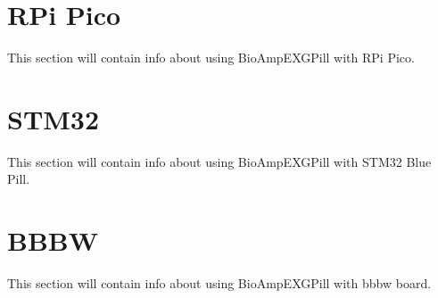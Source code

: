 \documentclass[a4paper,10pt,english,oneside]{sphinxmanual}
\begin{document}
\begin{DUlineblock}{0em}
\item[] 
\end{DUlineblock}


\section{RPi Pico}
\label{\detokenize{hardware/index:rpi-pico}}\label{\detokenize{hardware/index:open12}}
\sphinxAtStartPar
This section will contain info about using Bio\sphinxhyphen{}Amp\sphinxhyphen{}EXG\sphinxhyphen{}Pill with RPi Pico.

\begin{DUlineblock}{0em}
\item[] 
\end{DUlineblock}


\section{STM32}
\label{\detokenize{hardware/index:stm32}}\label{\detokenize{hardware/index:open13}}
\sphinxAtStartPar
This section will contain info about using Bio\sphinxhyphen{}Amp\sphinxhyphen{}EXG\sphinxhyphen{}Pill with STM32 Blue Pill.

\begin{DUlineblock}{0em}
\item[] 
\end{DUlineblock}


\section{BBBW}
\label{\detokenize{hardware/index:bbbw}}\label{\detokenize{hardware/index:open14}}
\sphinxAtStartPar
This section will contain info about using Bio\sphinxhyphen{}Amp\sphinxhyphen{}EXG\sphinxhyphen{}Pill with bbbw board.

\begin{DUlineblock}{0em}
\item[] 
\end{DUlineblock}



\renewcommand{\indexname}{Index}
\printindex
\end{document}
